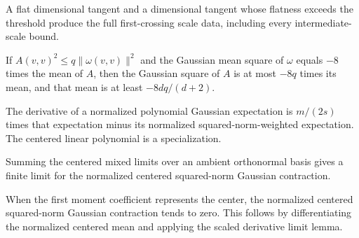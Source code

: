 \begin{lemma}
\label{lem:first-crossing-from-large-flatness}

A flat dimensional tangent and a dimensional tangent whose flatness exceeds the threshold produce the full first-crossing scale data, including every intermediate-scale bound.
\end{lemma}

\begin{lemma}
\label{lem:gaussian-rigidity-integral-bounds}

If $A(v,v)^2\le q\lVert\omega(v,v)\rVert^2$ and the Gaussian mean square of $\omega$ equals $-8$ times the mean of $A$, then the Gaussian square of $A$ is at most $-8q$ times its mean, and that mean is at least $-8dq/(d+2)$.
\end{lemma}

\begin{lemma}
\label{lem:normalized-gaussian-derivative}

The derivative of a normalized polynomial Gaussian expectation is $m/(2s)$ times that expectation minus its normalized squared-norm-weighted expectation. The centered linear polynomial is a specialization.
\end{lemma}

\begin{lemma}
\label{lem:centered-gaussian-full-contraction-exists}

Summing the centered mixed limits over an ambient orthonormal basis gives a finite limit for the normalized centered squared-norm Gaussian contraction.
\end{lemma}

\begin{lemma}
\label{lem:centered-gaussian-full-contraction-zero}

When the first moment coefficient represents the center, the normalized centered squared-norm Gaussian contraction tends to zero. This follows by differentiating the normalized centered mean and applying the scaled derivative limit lemma.
\end{lemma}

